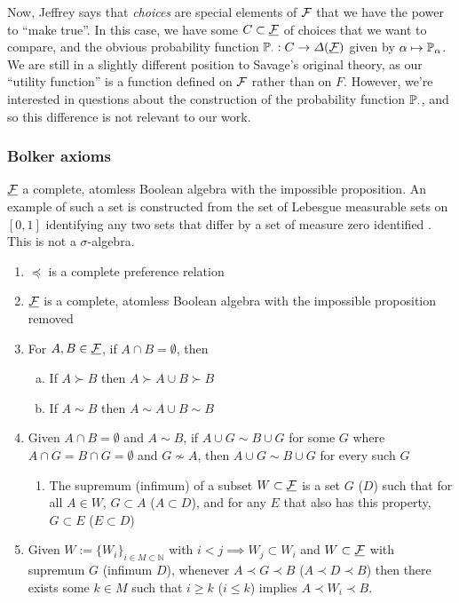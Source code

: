 
Now, Jeffrey says that \emph{choices} are special elements of $\mathcal{F}$ that we have the power to ``make true''. In this case, we have some $C\subset\underline{\mathcal{F}}$ of choices that we want to compare, and the obvious probability function $\mathbb{P}_\cdot: C\to \Delta(\underline{\mathcal{F}})$ given by $\alpha\mapsto \mathbb{P}_\alpha$. We are still in a slightly different position to Savage's original theory, as our ``utility function'' is a function defined on $\mathcal{F}$ rather than on $F$. However, we're interested in questions about the construction of the probability function $\mathbb{P}_\cdot$, and so this difference is not relevant to our work.

\subsubsection{Bolker axioms}

$\underline{\mathcal{F}}$ a complete, atomless Boolean algebra with the impossible proposition. An example of such a set is constructed from the set of Lebesgue measurable sets on $[0,1]$ identifying any two sets that differ by a set of measure zero identified \citet{bolker_simultaneous_1967}. This is not a $\sigma$-algebra.
 
\begin{enumerate}[A1:]
    \item $\preceq$ is a complete preference relation
    \item $\underline{\mathcal{F}}$ is a complete, atomless Boolean algebra with the impossible proposition removed
    \item For $A,B\in \underline{\mathcal{F}}$, if $A\cap B=\emptyset$, then
    \begin{enumerate}[a)]
        \item If $A\succ B$ then $A\succ A\cup B \succ B$
        \item If $A\sim B$ then $A\sim A\cup B \sim B$
    \end{enumerate}
    \item Given $A\cap B=\emptyset$ and $A\sim B$, if $A\cup G\sim B\cup G$ for some $G$ where $A\cap G=B\cap G=\emptyset$ and $G\not\sim A$, then $A\cup G\sim B\cup G$ for every such $G$
    \begin{enumerate}[D1:]
        \item The supremum (infimum) of a subset $W\subset \underline{\mathcal{F}}$ is a set $G$ ($D$) such that for all $A\in W$, $G\subset A$ ($A\subset D$), and for any $E$ that also has this property, $G\subset E$ ($E\subset D$)
    \end{enumerate}
    \item Given $W:= \{W_i\}_{i\in M\subset \mathbb{N}}$ with $i<j\implies W_j\subset W_i$ and $W\subset \underline{\mathcal{F}}$ with supremum $G$ (infimum $D$), whenever $A\prec G \prec B$ ($A\prec D\prec B$) then there exists some $k\in M$ such that $i\geq k$ ($i\leq k$) implies $A\prec W_i \prec B$.
\end{enumerate}

